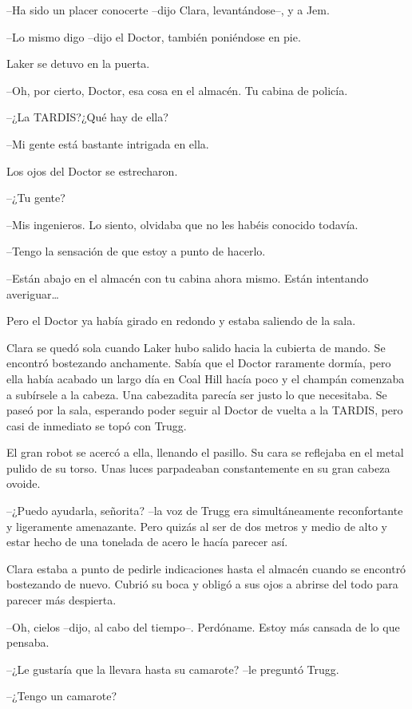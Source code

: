 {--Ha sido un placer conocerte --dijo Clara, levantándose--, y a Jem.}

{--Lo mismo digo --dijo el Doctor, también poniéndose en pie.}

{Laker se detuvo en la puerta.}

{--Oh, por cierto, Doctor, esa cosa en el almacén. Tu cabina de
policía.}

{--¿La TARDIS?\@ ¿Qué hay de ella?}

{--Mi gente está bastante intrigada en ella.}

{Los ojos del Doctor se estrecharon.}

{--¿Tu gente?}

{--Mis ingenieros. Lo siento, olvidaba que no les habéis conocido
todavía.}

{--Tengo la sensación de que estoy a punto de hacerlo.}

{--Están abajo en el almacén con tu cabina ahora mismo. Están intentando
 averiguar\ldots{}}

{Pero el Doctor ya había girado en redondo y estaba saliendo de la
sala.}

{Clara se quedó sola cuando Laker hubo salido
 hacia la cubierta de mando. Se encontró bostezando anchamente. Sabía que
 el Doctor raramente dormía, pero ella había acabado un largo día en Coal
 Hill hacía poco y el champán comenzaba a subírsele a la cabeza. Una
 cabezadita parecía ser justo lo que necesitaba. Se paseó por la sala,
 esperando poder seguir al Doctor de vuelta a la TARDIS, pero casi de
inmediato se topó con Trugg.}

{El gran robot se acercó a ella, llenando el pasillo. Su cara se
 reflejaba en el metal pulido de su torso. Unas luces parpadeaban
constantemente en su gran cabeza ovoide.}

{--¿Puedo ayudarla, señorita? --la voz de Trugg era simultáneamente
 reconfortante y ligeramente amenazante. Pero quizás al ser de dos metros
 y medio de alto y estar hecho de una tonelada de acero le hacía parecer
así.}

{Clara estaba a punto de pedirle indicaciones hasta el almacén cuando se
 encontró bostezando de nuevo. Cubrió su boca y obligó a sus ojos a
abrirse del todo para parecer más despierta.}

{--Oh, cielos --dijo, al cabo del tiempo--. Perdóname. Estoy más cansada
de lo que pensaba.}

{--¿Le gustaría que la llevara hasta su camarote? --le preguntó Trugg.}

{--¿Tengo un camarote?}

